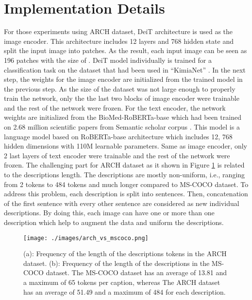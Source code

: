 \documentclass{midl}
\begin{document}
\section{Implementation Details}\label{appc}
For those experiments using ARCH dataset, DeiT architecture \cite{touvron2021training} is used as the image encoder. This architecture includes 12 layers and 768 hidden state and split the input image into  patches. As the result, each input image can be seen as 196 patches with the size of . DeiT model individually is trained for a classification task on the dataset that had been used in ``KimiaNet'' \cite{riasatian2021fine}. In the next step, the weights for the image encoder are initialized from the trained model in the previous step. As the size of the dataset was not large enough to properly train the network, only the the last two blocks of image encoder were trainable and the rest of the network were frozen.  For the text encoder, the network weights are initialized from the BioMed-RoBERTa-base \cite{domains} which had been trained on 2.68 million scientific papers from Semantic scholar corpus \cite{Semantic31:online}. 
This model is a language model based on RoBERTa-base architecture \cite{liu2019roberta} which includes 12, 768 hidden dimensions with 110M learnable parameters. Same as image encoder, only 2 last layers of text encoder were trainable and the rest of the network were frozen. The challenging part for ARCH dataset as it shown in Figure \ref{token_length} is related to the descriptions length. The descriptions are mostly non-uniform, i.e., ranging from 2 tokens to 484 tokens and much longer compared to MS-COCO dataset. To address this problem, each description is split into sentences. Then, concatenation of the first sentence with every other sentence are considered as new individual descriptions. By doing this, each image can have one or more than one description which help to augment the data and uniform the descriptions. 
 
\begin{figure}[t!]
    \centering
    \texttt{[image: ./images/arch\_vs\_mscoco.png]}
    \caption{(a): Frequency of the length of the descriptions tokens in the ARCH dataset. (b): Frequency of the length of the descriptions in the MS-COCO dataset. The MS-COCO dataset has an average of 13.81 and a maximum of 65 tokens per caption, whereas The ARCH dataset has an average of 51.49 and a maximum of 484 for each description.}
    \label{token_length}
\end{figure}
\end{document}
